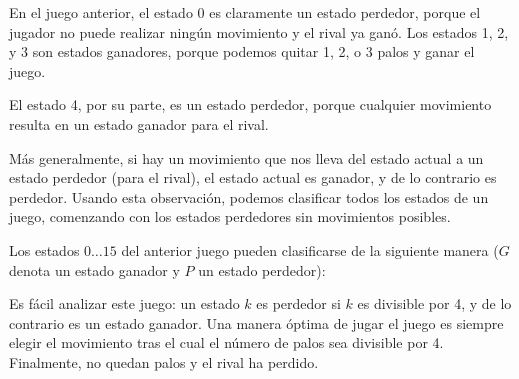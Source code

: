En el juego anterior, el estado 0 es claramente un estado perdedor, porque
el jugador no puede realizar ningún movimiento y el rival ya ganó. Los
estados 1, 2, y 3 son estados ganadores, porque podemos quitar 1, 2, o 3
palos y ganar el juego.

El estado 4, por su parte, es un estado perdedor, porque cualquier
movimiento resulta en un estado ganador para el rival.

Más generalmente, si hay un movimiento que nos lleva del estado actual
a un estado perdedor (para el rival), el estado actual es ganador,
y de lo contrario es perdedor. Usando esta observación,
podemos clasificar todos los estados de un juego, comenzando con los
estados perdedores sin movimientos posibles.

Los estados $0 \ldots 15$ del anterior juego pueden clasificarse de la
siguiente manera ($G$ denota un estado ganador y $P$ un estado perdedor):
\begin{center}
\end{center}

Es fácil analizar este juego: un estado $k$ es perdedor si $k$ es divisible
por 4, y de lo contrario es un estado ganador. Una manera óptima de jugar
el juego es siempre elegir el movimiento tras el cual el número de palos
sea divisible por 4. Finalmente, no quedan palos y el rival ha perdido.

